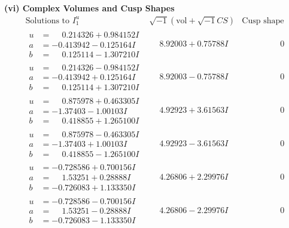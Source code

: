 \documentclass[1p]{elsarticle_modified}
\theoremstyle{definition}
\newcommand{\I}{\sqrt{-1}}
\begin{document}
\newpage\flushleft \textbf{(vi) Complex Volumes and Cusp Shapes}
$$\begin{array}{c|c|c}  
\text{Solutions to }I^u_{1}& \I (\text{vol} + \sqrt{-1}CS) & \text{Cusp shape}\\
 \hline 
\begin{aligned}
u &= \phantom{-}0.214326 + 0.984152 I \\
a &= -0.413942 - 0.125164 I \\
b &= \phantom{-}0.125114 - 1.307210 I\end{aligned}
 & \phantom{-}8.92003 + 0.75788 I & \phantom{-0.000000 } 0 \\ \hline\begin{aligned}
u &= \phantom{-}0.214326 - 0.984152 I \\
a &= -0.413942 + 0.125164 I \\
b &= \phantom{-}0.125114 + 1.307210 I\end{aligned}
 & \phantom{-}8.92003 - 0.75788 I & \phantom{-0.000000 } 0 \\ \hline\begin{aligned}
u &= \phantom{-}0.875978 + 0.463305 I \\
a &= -1.37403 - 1.00103 I \\
b &= \phantom{-}0.418855 + 1.265100 I\end{aligned}
 & \phantom{-}4.92923 + 3.61563 I & \phantom{-0.000000 } 0 \\ \hline\begin{aligned}
u &= \phantom{-}0.875978 - 0.463305 I \\
a &= -1.37403 + 1.00103 I \\
b &= \phantom{-}0.418855 - 1.265100 I\end{aligned}
 & \phantom{-}4.92923 - 3.61563 I & \phantom{-0.000000 } 0 \\ \hline\begin{aligned}
u &= -0.728586 + 0.700156 I \\
a &= \phantom{-}1.53251 + 0.28888 I \\
b &= -0.726083 + 1.133350 I\end{aligned}
 & \phantom{-}4.26806 + 2.29976 I & \phantom{-0.000000 } 0 \\ \hline\begin{aligned}
u &= -0.728586 - 0.700156 I \\
a &= \phantom{-}1.53251 - 0.28888 I \\
b &= -0.726083 - 1.133350 I\end{aligned}
 & \phantom{-}4.26806 - 2.29976 I & \phantom{-0.000000 } 0 \\ \hline\begin{aligned}

\end{aligned}
\end{array}$$
\end{document}

